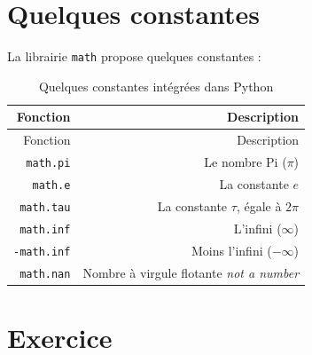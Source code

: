 \documentclass[
  12pt,
]{book}
\numberwithin{equation}{section}
\numberwithin{countremarque}{section}
\begin{document}
\section{Quelques constantes}\label{quelques-constantes}

La librairie \texttt{math} propose quelques constantes :

\begin{longtable}[]{@{}rr@{}}
\caption{\label{tab:constantes-base} Quelques constantes intégrées dans Python}\tabularnewline
\toprule\noalign{}
Fonction & Description \\
\midrule\noalign{}
\endfirsthead
\toprule\noalign{}
Fonction & Description \\
\midrule\noalign{}
\endhead
\bottomrule\noalign{}
\endlastfoot
\texttt{math.pi} & Le nombre Pi (\(\pi\)) \\
\texttt{math.e} & La constante \(e\) \\
\texttt{math.tau} & La constante \(\tau\), égale à \(2\pi\) \\
\texttt{math.inf} & L'infini (\(\infty\)) \\
\texttt{-math.inf} & Moins l'infini (\(-\infty\)) \\
\texttt{math.nan} & Nombre à virgule flotante \emph{not a number} \\
\end{longtable}

\section{Exercice}\label{exercice-2}
\end{document}

